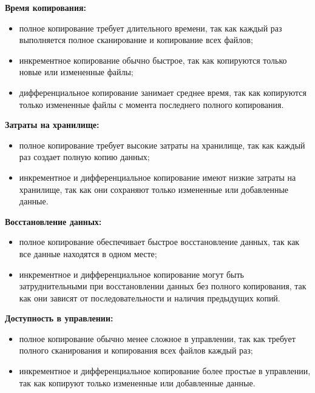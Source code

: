\begin{flushleft}
\textbf{Время копирования:}
\end{flushleft}

\begin{itemize}
\item полное копирование требует длительного времени, так как каждый раз выполняется полное сканирование и копирование всех файлов;
\item инкрементное копирование обычно быстрое, так как копируются только новые или измененные файлы;
\item дифференциальное копирование занимает среднее время, так как копируются только измененные файлы с момента последнего полного копирования.
\end{itemize}

\begin{flushleft}
\textbf{Затраты на хранилище:}
\end{flushleft}

\begin{itemize}
\item полное копирование требует высокие затраты на хранилище, так как каждый раз создает полную копию данных;
\item инкрементное и дифференциальное копирование имеют низкие затраты на хранилище, так как они сохраняют только измененные или добавленные данные. 
\end{itemize}

\begin{flushleft}
\textbf{Восстановление данных:}
\end{flushleft}

\begin{itemize}
\item полное копирование обеспечивает быстрое восстановление данных, так как все данные находятся в одном месте;
\item инкрементное и дифференциальное копирование могут быть затруднительными при восстановлении данных без полного копирования, так как они зависят от последовательности и наличия предыдущих копий.
\end{itemize}

\begin{flushleft}
\textbf{Доступность в управлении:}
\end{flushleft}

\begin{itemize}
\item полное копирование обычно менее сложное в управлении, так как требует полного сканирования и копирования всех файлов каждый раз;
\item инкрементное и дифференциальное копирование более простые в управлении, так как копируют только измененные или добавленные данные.
\end{itemize}

